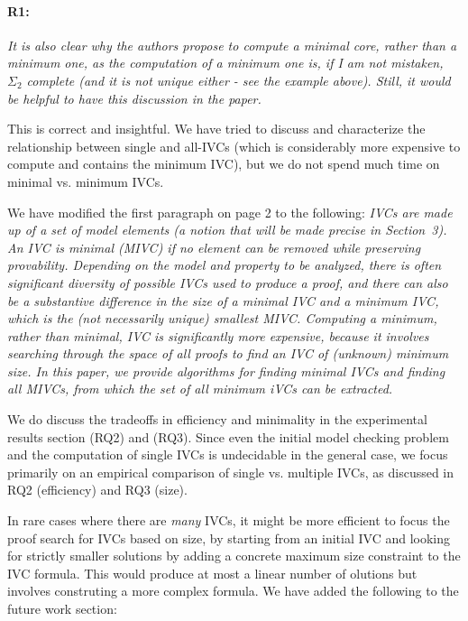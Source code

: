 \documentclass{article}
\begin{document}
\paragraph{R1:} \textit{It is also clear why the authors propose to compute a minimal core, rather than a minimum one, as the computation of a minimum one is, if I am not mistaken, $\Sigma_2$ complete (and it is not unique either - see the example above). Still, it would be helpful to have this discussion in the paper.}
\vspace{0.05in}

\noindent This is correct and insightful.  We have tried to discuss and characterize the relationship between single and all-IVCs (which is considerably more expensive to compute and contains the minimum IVC), but we do not spend much time on minimal vs. minimum IVCs.

We have modified the first paragraph on page 2 to the following:
\textit{IVCs are made up of a set of model elements (a notion that will be made precise in Section~3).  An IVC is {\em minimal} (MIVC) if no element can be removed while preserving provability.  Depending on the model and property to be analyzed, there is often significant diversity of possible IVCs used to produce a proof, and there can also be a substantive difference in the size of a {\em minimal} IVC and a {\em minimum} IVC, which is the (not necessarily unique) smallest MIVC.  Computing a minimum, rather than minimal, IVC is significantly more expensive, because it involves searching through the space of all proofs to find an IVC of (unknown) minimum size.  In this paper, we provide algorithms for finding minimal IVCs and finding {\em all} MIVCs, from which the set of all minimum iVCs can be extracted.}

We do discuss the tradeoffs in efficiency and minimality in the experimental results section (RQ2) and (RQ3).  Since even the initial model checking problem and the computation of single IVCs is undecidable in the general case, we focus primarily on an empirical comparison of single vs. multiple IVCs, as discussed in RQ2 (efficiency) and RQ3 (size).

In rare cases where there are {\em many} IVCs, it might be more efficient to focus the proof search for IVCs based on size, by starting from an initial IVC and looking for strictly smaller solutions by adding a concrete maximum size constraint to the IVC formula.  This would produce at most a linear number of olutions but involves construting a more complex formula.  We have added the following to the future work section:
\end{document}
